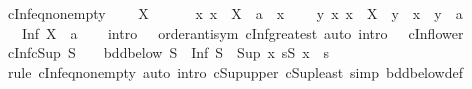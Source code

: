 \begin{isabellebody}
\endisatagproof
{\isafoldproof}%
%
\isadelimproof
\isanewline
%
\endisadelimproof
\isanewline
{}\isamarkupfalse%
\ cInf{\isacharunderscore}{\kern0pt}eq{\isacharunderscore}{\kern0pt}non{\isacharunderscore}{\kern0pt}empty{\isacharcolon}{\kern0pt}\isanewline
\ \ \ {}{\isacharcolon}{\kern0pt}\ {\isachardoublequoteopen}X\ {\isasymnoteq}\ {\isacharbraceleft}{\kern0pt}{\isacharbraceright}{\kern0pt}{\isachardoublequoteclose}\isanewline
\ \ \ {}{\isacharcolon}{\kern0pt}\ {\isachardoublequoteopen}{\isasymAnd}x{\isachardot}{\kern0pt}\ x\ {\isasymin}\ X\ {\isasymLongrightarrow}\ a\ {\isasymle}\ x{\isachardoublequoteclose}\isanewline
\ \ \ {}{\isacharcolon}{\kern0pt}\ {\isachardoublequoteopen}{\isasymAnd}y{\isachardot}{\kern0pt}\ {\isacharparenleft}{\kern0pt}{\isasymAnd}x{\isachardot}{\kern0pt}\ x\ {\isasymin}\ X\ {\isasymLongrightarrow}\ y\ {\isasymle}\ x{\isacharparenright}{\kern0pt}\ {\isasymLongrightarrow}\ y\ {\isasymle}\ a{\isachardoublequoteclose}\isanewline
\ \ \ {\isachardoublequoteopen}Inf\ X\ {\isacharequal}{\kern0pt}\ a{\isachardoublequoteclose}\isanewline
%
\isadelimproof
\ \ %
\endisadelimproof
%
\isatagproof
{}\isamarkupfalse%
\ {\isacharparenleft}{\kern0pt}intro\ {}\ {}\ order{\isachardot}{\kern0pt}antisym\ cInf{\isacharunderscore}{\kern0pt}greatest{\isacharparenright}{\kern0pt}\ {\isacharparenleft}{\kern0pt}auto\ intro{\isacharcolon}{\kern0pt}\ {}\ {}\ cInf{\isacharunderscore}{\kern0pt}lower{\isacharparenright}{\kern0pt}%
\endisatagproof
{\isafoldproof}%
%
\isadelimproof
\isanewline
%
\endisadelimproof
\isanewline
{}\isamarkupfalse%
\ cInf{\isacharunderscore}{\kern0pt}cSup{\isacharcolon}{\kern0pt}\ {\isachardoublequoteopen}S\ {\isasymnoteq}\ {\isacharbraceleft}{\kern0pt}{\isacharbraceright}{\kern0pt}\ {\isasymLongrightarrow}\ bdd{\isacharunderscore}{\kern0pt}below\ S\ {\isasymLongrightarrow}\ Inf\ S\ {\isacharequal}{\kern0pt}\ Sup\ {\isacharbraceleft}{\kern0pt}x{\isachardot}{\kern0pt}\ {\isasymforall}s{\isasymin}S{\isachardot}{\kern0pt}\ x\ {\isasymle}\ s{\isacharbraceright}{\kern0pt}{\isachardoublequoteclose}\isanewline
%
\isadelimproof
\ \ %
\endisadelimproof
%
\isatagproof
{}\isamarkupfalse%
\ {\isacharparenleft}{\kern0pt}rule\ cInf{\isacharunderscore}{\kern0pt}eq{\isacharunderscore}{\kern0pt}non{\isacharunderscore}{\kern0pt}empty{\isacharparenright}{\kern0pt}\ {\isacharparenleft}{\kern0pt}auto\ intro{\isacharbang}{\kern0pt}{\isacharcolon}{\kern0pt}\ cSup{\isacharunderscore}{\kern0pt}upper\ cSup{\isacharunderscore}{\kern0pt}least\ simp{\isacharcolon}{\kern0pt}\ bdd{\isacharunderscore}{\kern0pt}below{\isacharunderscore}{\kern0pt}def{\isacharparenright}{\kern0pt}%

\end{isabellebody}
